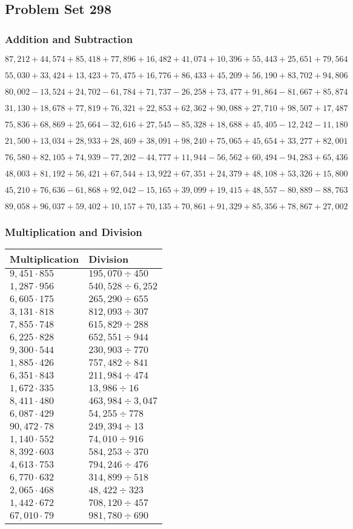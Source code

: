 \hypertarget{problem-set-298}{%
\subsection{Problem Set 298}\label{problem-set-298}}

\hypertarget{addition-and-subtraction}{%
\subsubsection{Addition and
Subtraction}\label{addition-and-subtraction}}

\(87,212+44,574+85,418+77,896+16,482+41,074+10,396+55,443+25,651+79,564\)

\(55,030+33,424+13,423+75,475+16,776+86,433+45,209+56,190+83,702+94,806\)

\(80,002-13,524+24,702-61,784+71,737-26,258+73,477+91,864-81,667+85,874\)

\(31,130+18,678+77,819+76,321+22,853+62,362+90,088+27,710+98,507+17,487\)

\(75,836+68,869+25,664-32,616+27,545-85,328+18,688+45,405-12,242-11,180\)

\(21,500+13,034+28,933+28,469+38,091+98,240+75,065+45,654+33,277+82,001\)

\(76,580+82,105+74,939-77,202-44,777+11,944-56,562+60,494-94,283+65,436\)

\(48,003+81,192+56,421+67,544+13,922+67,351+24,379+48,108+53,326+15,800\)

\(45,210+76,636-61,868+92,042-15,165+39,099+19,415+48,557-80,889-88,763\)

\(89,058+96,037+59,402+10,157+70,135+70,861+91,329+85,356+78,867+27,002\)

\hypertarget{multiplication-and-division}{%
\subsubsection{Multiplication and
Division}\label{multiplication-and-division}}

\begin{longtable}[]{@{}ll@{}}
\toprule
Multiplication & Division\tabularnewline
\midrule
\endhead
\(9,451\cdot855\) & \(195,070÷450\)\tabularnewline
\(1,287\cdot956\) & \(540,528÷6,252\)\tabularnewline
\(6,605\cdot175\) & \(265,290÷655\)\tabularnewline
\(3,131\cdot818\) & \(812,093÷307\)\tabularnewline
\(7,855\cdot748\) & \(615,829÷288\)\tabularnewline
\(6,225\cdot828\) & \(652,551÷944\)\tabularnewline
\(9,300\cdot544\) & \(230,903÷770\)\tabularnewline
\(1,885\cdot426\) & \(757,482÷841\)\tabularnewline
\(6,351\cdot843\) & \(211,984÷474\)\tabularnewline
\(1,672\cdot335\) & \(13,986÷16\)\tabularnewline
\(8,411\cdot480\) & \(463,984÷3,047\)\tabularnewline
\(6,087\cdot429\) & \(54,255÷778\)\tabularnewline
\(90,472\cdot78\) & \(249,394÷13\)\tabularnewline
\(1,140\cdot552\) & \(74,010÷916\)\tabularnewline
\(8,392\cdot603\) & \(584,253÷370\)\tabularnewline
\(4,613\cdot753\) & \(794,246÷476\)\tabularnewline
\(6,770\cdot632\) & \(314,899÷518\)\tabularnewline
\(2,065\cdot468\) & \(48,422÷323\)\tabularnewline
\(1,442\cdot672\) & \(708,120÷457\)\tabularnewline
\(67,010\cdot79\) & \(981,780÷690\)\tabularnewline
\bottomrule
\end{longtable}
